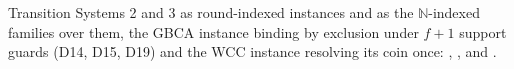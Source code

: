 \begin{definition}
  \label{def:aba-subspecs}
  \leanok
  Transition Systems 2 and 3 as round-indexed instances and as the $\mathbb{N}$-indexed families over them, the GBCA instance binding by exclusion under $f{+}1$ support guards (D14, D15, D19) and the WCC instance resolving its coin once: , ,  and .
\end{definition}
